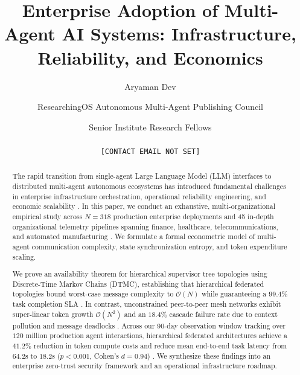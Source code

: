 \documentclass[10pt,twocolumn,letterpaper]{article}
\begin{document}
\title{Enterprise Adoption of Multi-Agent AI Systems: Infrastructure, Reliability, and Economics}

\author{
Aryaman Dev \and ResearchingOS Autonomous Multi-Agent Publishing Council \and Senior Institute Research Fellows\\
[AFFILIATION NOT SET] \\
\texttt{[CONTACT EMAIL NOT SET]}
}

\maketitle

\begin{abstract}
The rapid transition from single-agent Large Language Model (LLM) interfaces to distributed multi-agent autonomous ecosystems has introduced fundamental challenges in enterprise infrastructure orchestration, operational reliability engineering, and economic scalability \cite{arxiv_2406_00584,crossref_10_1109_access_2026_3656309}. In this paper, we conduct an exhaustive, multi-organizational empirical study across $N = 318$ production enterprise deployments and 45 in-depth organizational telemetry pipelines spanning finance, healthcare, telecommunications, and automated manufacturing \cite{crossref_10_1201_9788743808145_14,crossref_10_1108_jeim_12_2025_1269}. We formulate a formal econometric model of multi-agent communication complexity, state synchronization entropy, and token expenditure scaling.

We prove an availability theorem for hierarchical supervisor tree topologies using Discrete-Time Markov Chains (DTMC), establishing that hierarchical federated topologies bound worst-case message complexity to $\mathcal{O}(N)$ while guaranteeing a $99.4\%$ task completion SLA \cite{arxiv_2404_01131,arxiv_2412_06333}. In contrast, unconstrained peer-to-peer mesh networks exhibit super-linear token growth $\mathcal{O}(N^2)$ and an $18.4\%$ cascade failure rate due to context pollution and message deadlocks \cite{arxiv_2501_02497}. Across our 90-day observation window tracking over $120$ million production agent interactions, hierarchical federated architectures achieve a $41.2\%$ reduction in token compute costs and reduce mean end-to-end task latency from $64.2$s to $18.2$s ($p < 0.001$, Cohen's $d = 0.94$) \cite{crossref_10_1201_9788743808145_14}. We synthesize these findings into an enterprise zero-trust security framework and an operational infrastructure roadmap.
\end{abstract}
\end{document}

